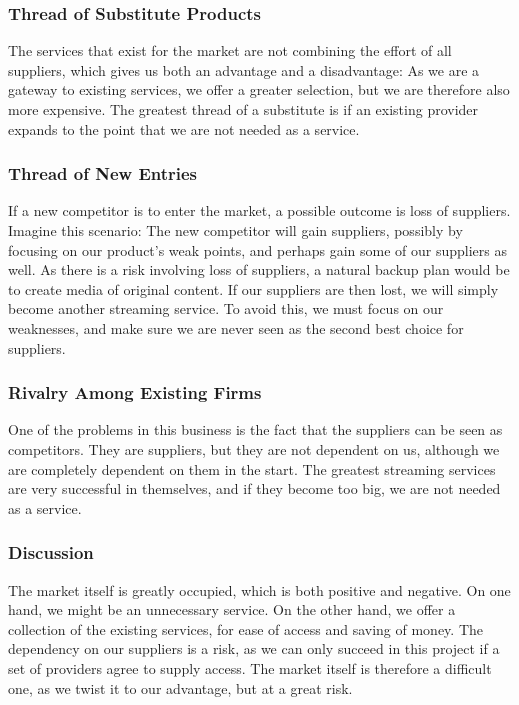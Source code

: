 \subsubsection*{Thread of Substitute Products}
The services that exist for the market are not combining the effort of all suppliers, which gives us both an advantage and a disadvantage: As we are a gateway to existing services, we offer a greater selection, but we are therefore also more expensive. The greatest thread of a substitute is if an existing provider expands to the point that we are not needed as a service.

\subsubsection*{Thread of New Entries}
If a new competitor is to enter the market, a possible outcome is loss of suppliers. Imagine this scenario: The new competitor will gain suppliers, possibly by focusing on our product's weak points, and perhaps gain some of our suppliers as well. As there is a risk involving loss of suppliers, a natural backup plan would be to create media of original content. If our suppliers are then lost, we will simply become another streaming service. To avoid this, we must focus on our weaknesses, and make sure we are never seen as the second best choice for suppliers.

\subsubsection*{Rivalry Among Existing Firms}
One of the problems in this business is the fact that the suppliers can be seen as competitors. They are suppliers, but they are not dependent on us, although we are completely dependent on them in the start. The greatest streaming services are very successful in themselves, and if they become too big, we are not needed as a service.

\subsubsection*{Discussion}
The market itself is greatly occupied, which is both positive and negative. On one hand, we might be an unnecessary service. On the other hand, we offer a collection of the existing services, for ease of access and saving of money. The dependency on our suppliers is a risk, as we can only succeed in this project if a set of providers agree to supply access. The market itself is therefore a difficult one, as we twist it to our advantage, but at a great risk.